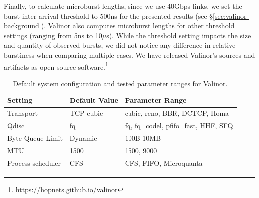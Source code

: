 Finally, to calculate microburst lengths, since we use 40Gbps links, we set the burst inter-arrival threshold to 500ns for the presented results (see \S\ref{sec:valinor-background}). Valinor also computes microburst lengths for other threshold settings (ranging from 5ns to 10$\mu$s). 
While the threshold setting impacts the size and quantity of observed bursts, we did not notice any difference in relative burstiness when comparing multiple cases.
We have released Valinor's sources and artifacts as open-source software.\footnote{\url{https://hopnets.github.io/valinor}}


\begin{table}[t]
\centering

\begin{tabular}{l|l|l}
\textbf{Setting}           & \textbf{Default Value} & \textbf{Parameter Range}                                \\ \hline \hline
Transport         & TCP cubic     & cubic, reno, BBR, DCTCP, Homa        \\ \hline
Qdisc             & fq            & fq, fq\_codel, pfifo\_fast, HHF, SFQ \\ \hline
Byte Queue Limit  & Dynamic       & 100B-10MB                      \\ \hline
MTU               & 1500          & 1500, 9000                           \\ \hline
Process scheduler & CFS           & CFS, FIFO, Microquanta               \\ 
\end{tabular}
\caption{\small{Default system configuration and tested parameter ranges for Valinor.}}
	\label{tab:ranges}
\end{table}

